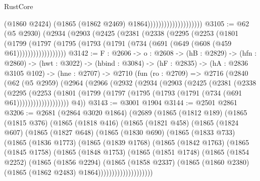\begin{lexlean}{RustCore}
\begin{coremodule}
                                          (@1860 @2424)
                                          (@1865 (@1862 @2469) @1864))))))))))))))))))))
@3105 := @62
    (@5 @2930)
    (@2934
      (@2903
        (@2425
          (@2381
            (@2338
              (@2295
                (@2253
                  (@1801
                    (@1799
                      (@1797
                        (@1795 (@1793 (@1791 (@734 (@691 (@649 (@608 (@459 @61))))))))))))))))))
@3142 := {F : @2606} ->
  {o : @2608} ->
  (hB : @2829) ->
  (hfn : @2860) ->
  (hwt : @3022) ->
  (hbind : @3084) ->
  (hF : @2835) ->
  (hA : @2836 @3105 @102) ->
  (hne : @2707) ->
  @2710
    (fun (ro : @2709) =>
    @2716
      (@2840
        (@62
          (@5 @2959)
          (@2964
            (@2966
              (@2932
                (@2934
                  (@2903
                    (@2425
                      (@2381
                        (@2338
                          (@2295
                            (@2253
                              (@1801
                                (@1799
                                  (@1797 (@1795 (@1793 (@1791 (@734 (@691 @61)))))))))))))))))))
        @4))
@3143 := @3001 @1904
@3144 := @2501 @2861
@3206 := @2681
    (@2864 @3020 @1864)
    (@2689
      (@1865
        (@1812 @189)
        (@1865
          (@1815 @376)
          (@1865
            (@1818 @416)
            (@1865
              (@1821 @458)
              (@1865
                (@1824 @607)
                (@1865
                  (@1827 @648)
                  (@1865
                    (@1830 @690)
                    (@1865
                      (@1833 @733)
                      (@1865
                        (@1836 @1773)
                        (@1865
                          (@1839 @1768)
                          (@1865
                            (@1842 @1763)
                            (@1865
                              (@1845 @1758)
                              (@1865
                                (@1848 @1753)
                                (@1865
                                  (@1851 @1748)
                                  (@1865
                                    (@1854 @2252)
                                    (@1865
                                      (@1856 @2294)
                                      (@1865
                                        (@1858 @2337)
                                        (@1865
                                          (@1860 @2380)
                                          (@1865 (@1862 @2483) @1864))))))))))))))))))))

\end{coremodule}
\end{lexlean}
